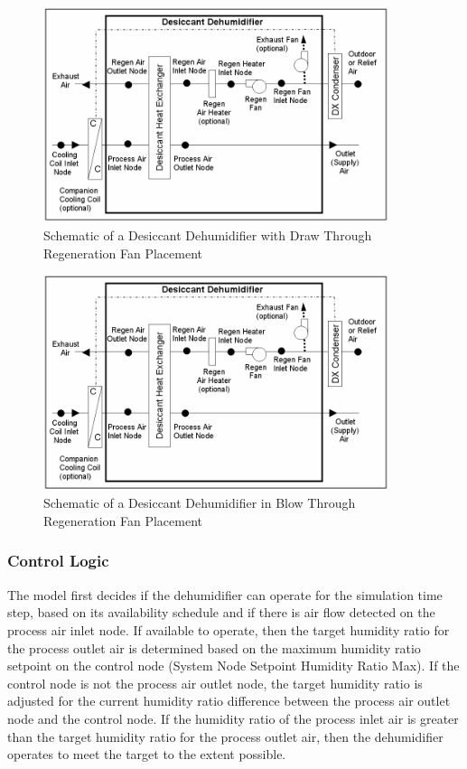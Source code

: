 \begin{figure}[hbtp] %
\centering
\includegraphics[width=0.9\textwidth, height=0.9\textheight, keepaspectratio=true]{media/image5199.png}
\caption{Schematic of a Desiccant Dehumidifier with Draw Through Regeneration Fan Placement \protect \label{fig:schematic-of-a-desiccant-dehumidifier-with}}
\end{figure}

\begin{figure}[hbtp] %
\centering
\includegraphics[width=0.9\textwidth, height=0.9\textheight, keepaspectratio=true]{media/image5200.png}
\caption{Schematic of a Desiccant Dehumidifier in Blow Through Regeneration Fan Placement \protect \label{fig:schematic-of-a-desiccant-dehumidifier-in-blow}}
\end{figure}

\subsubsection{Control Logic}\label{control-logic}

The model first decides if the dehumidifier can operate for the simulation time step, based on its availability schedule and if there is air flow detected on the process air inlet node. If available to operate, then the target humidity ratio for the process outlet air is determined based on the maximum humidity ratio setpoint on the control node (System Node Setpoint Humidity Ratio Max). If the control node is not the process air outlet node, the target humidity ratio is adjusted for the current humidity ratio difference between the process air outlet node and the control node. If the humidity ratio of the process inlet air is greater than the target humidity ratio for the process outlet air, then the dehumidifier operates to meet the target to the extent possible.

